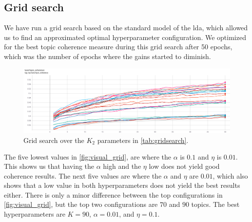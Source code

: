 \subsection{Grid search}\label{sec:appendix_grid_search}
We have run a grid search based on the standard model of the \gls{lda}, which allowed us to find an approximated optimal hyperparameter configuration.
We optimized for the best topic coherence measure during this grid search after 50 epochs, which was the number of epochs where the gains started to diminish.
\begin{figure}
	\includegraphics[width=\textwidth]{figures/gridsearch.png}
	\caption{Grid search over the $K_2$ parameters in \autoref{tab:gridsearch}.}
	\label{fig:visual_grid}
\end{figure} 
The five lowest values in \autoref{fig:visual_grid}, are where the $\alpha$ is $0.1$ and $\eta$ is $0.01$. 
This shows us that having the $\alpha$ high and the $\eta$ low does not yield good coherence results.
The next five values are where the $\alpha$ and $\eta$ are $0.01$, which also shows that a low value in both hyperparameters does not yield the best results either.
There is only a minor difference between the top configurations in \autoref{fig:visual_grid}, but the top two configurations are $70$ and $90$ topics.
The best hyperparameters are $K = 90$, $\alpha = 0.01$, and $\eta = 0.1$.
